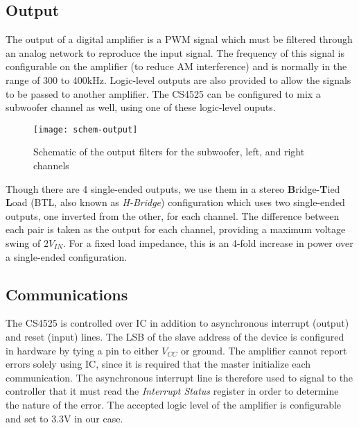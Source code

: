 \subsection{Output}
The output of a digital amplifier is a PWM signal which must be filtered through an analog network to reproduce the input signal. The frequency of this signal is configurable on the amplifier (to reduce AM interference) and is normally in the range of 300 to 400kHz. Logic-level outputs are also provided to allow the signals to be passed to another amplifier. The CS4525 can be configured to mix a subwoofer channel as well, using one of these logic-level ouputs.
\begin{figure}[H]
	\centering
	\texttt{[image: schem-output]}
	\caption[Schematic -- Amplifier Output Filters]%
	{Schematic of the output filters for the subwoofer, left, and right channels}
\end{figure}
Though there are 4 single-ended outputs, we use them in a stereo \textbf{B}ridge-\textbf{T}ied \textbf{L}oad (BTL, also known as \textit{H-Bridge}) configuration which uses two single-ended outputs, one inverted from the other, for each channel. The difference between each pair is taken as the output for each channel, providing a maximum voltage swing of $2V_{IN}$. For a fixed load impedance, this is an 4-fold increase in power over a single-ended configuration.
\subsection{Communications}
The CS4525 is controlled over IC in addition to asynchronous interrupt (output) and reset (input) lines. The LSB of the slave address of the device is configured in hardware by tying a pin to either $V_{CC}$ or ground. The amplifier cannot report errors solely using IC, since it is required that the master initialize each communication. The asynchronous interrupt line is therefore used to signal to the controller that it must read the \textit{Interrupt Status} register in order to determine the nature of the error. The accepted logic level of the amplifier is configurable and set to 3.3V in our case.
